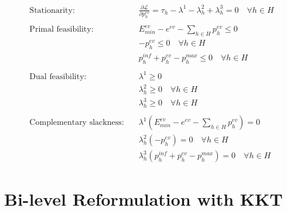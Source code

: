 \begin{align*}
	\text{Stationarity:} \quad
	 & \frac{\partial \mathcal{L}}{\partial p^{ev}_h} = \tau_h - \lambda^1 -  \lambda^2_h + \lambda^3_h = 0 \quad \forall h \in H \\
	\\
	\text{Primal feasibility:} \quad
	 & E^{ev}_{min} - e^{ev} - \sum_{h \in H} p^{ev}_h \leq 0   \\
     & -p^{ev}_{h}\leq 0 \quad \forall h \in H                                                   \\
	 & p^{inf}_h + p^{ev}_h - p^{max}_h \leq 0 \quad \forall h \in H                                               \\ \\
	\text{Dual feasibility:} \quad
	 & \lambda^1 \geq 0                                                                                            \\
	 & \lambda^2_h \geq 0 \quad \forall h \in H    \\                                                                
	& \lambda^3_h \geq 0 \quad \forall h \in H    \\\\
     \text{Complementary slackness:} \quad 
	 & \lambda^1 \left( E^{ev}_{min} - e^{ev} - \sum_{h \in H} p^{ev}_h \right) = 0                                \\
     & \lambda^2_h \left( - p^{ev}_h \right) = 0 \quad \forall h \in H    \\
	 & \lambda^3_h \left( p^{inf}_h + p^{ev}_h - p^{max}_h \right) = 0 \quad \forall h \in H
\end{align*}

\newpage
\section{Bi-level Reformulation with KKT}

